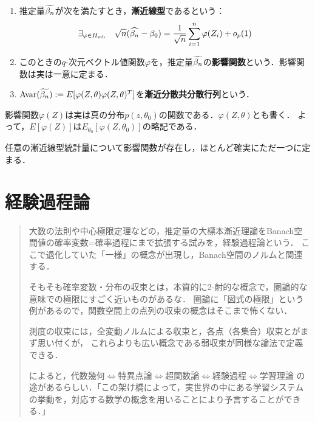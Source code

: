 \documentclass[uplatex,dvipdfmx]{jsreport}
\begin{document}
\begin{definition}\mbox{}
    \begin{enumerate}
        \item 推定量$\widetilde{\beta_n}$が次を満たすとき，\textbf{漸近線型}であるという：
        \[\exists_{\varphi\in H_{\mathrm{mb}}}\quad\sqrt{n}(\widehat{\beta_n}-\beta_0)=\frac{1}{\sqrt{n}}\sum^n_{i=1}\varphi(Z_i)+o_p(1)\]
        \item このときの$q$-次元ベクトル値関数$\varphi$を，推定量$\widetilde{\beta_n}$の\textbf{影響関数}という．影響関数は実は一意に定まる．
        \item $\mathrm{Avar}(\widetilde{\beta_n}):=E[\varphi(Z,\theta)\varphi(Z,\theta)^T]$を\textbf{漸近分散共分散行列}という．
    \end{enumerate}
\end{definition}
\begin{remark}
    影響関数$\varphi(Z)$は実は真の分布$p(z,\theta_0)$の関数である．$\varphi(Z,\theta)$とも書く．
    よって，$E[\varphi(Z)]$は$E_{\theta_0}[\varphi(Z,\theta_0)]$の略記である．
\end{remark}

\begin{theorem}
    任意の漸近線型統計量について影響関数が存在し，ほとんど確実にただ一つに定まる．
\end{theorem}

\chapter{経験過程論}

\begin{quotation}
    大数の法則や中心極限定理などの，推定量の大標本漸近理論をBanach空間値の確率変数=確率過程にまで拡張する試みを，経験過程論という．
    ここで退化していた「一様」の概念が出現し，Banach空間のノルムと関連する．

    そもそも確率変数・分布の収束とは，本質的に2-射的な概念で，圏論的な意味での極限にすごく近いものがあるな．
    圏論に「図式の極限」という例があるので，関数空間上の点列の収束の概念はそこまで怖くない．

    測度の収束には，全変動ノルムによる収束と，各点（各集合）収束とがまず思い付くが，
    これらよりも広い概念である弱収束が同様な論法で定義できる．

    \cite{渡辺澄夫}によると，代数幾何$\Leftrightarrow$特異点論$\Leftrightarrow$超関数論$\Leftrightarrow$経験過程$\Leftrightarrow$学習理論
    の途があるらしい．「この架け橋によって，実世界の中にある学習システムの挙動を，対応する数学の概念を用いることにより予言することができる．」
\end{quotation}
\end{document}
